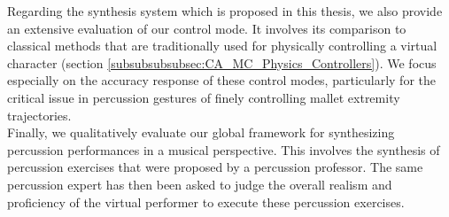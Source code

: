 Regarding the synthesis system which is proposed in this thesis, we also provide an extensive evaluation of our control mode. It involves its comparison to classical methods that are traditionally used for physically controlling a virtual character (section \ref{subsubsubsubsec:CA_MC_Physics_Controllers}). We focus especially on the accuracy response of these control modes, particularly for the critical issue in percussion gestures of finely controlling mallet extremity trajectories.\\

Finally, we qualitatively evaluate our global framework for synthesizing percussion performances in a musical perspective. This involves the synthesis of percussion exercises that were proposed by a percussion professor. The same percussion expert has then been asked to judge the overall realism and proficiency of the virtual performer to execute these percussion exercises.



